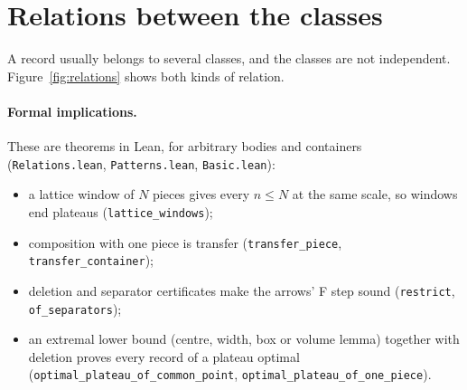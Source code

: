 \documentclass[11pt,a4paper]{article}
\newcommand{\code}[1]{\texttt{\nolinkurl{#1}}}
\newcommand{\lean}[1]{\texttt{#1}}
\theoremstyle{definition}
\theoremstyle{remark}
\begin{document}
\section{Relations between the classes}\label{sec:relations}

A record usually belongs to several classes, and the classes are not independent. Figure~\ref{fig:relations} shows both kinds of relation.

\paragraph{Formal implications.} These are theorems in Lean, for arbitrary bodies and containers (\code{Relations.lean}, \code{Patterns.lean}, \code{Basic.lean}):
\begin{itemize}
\item a lattice window of $N$ pieces gives every $n\le N$ at the same scale, so windows end plateaus (\lean{lattice\_windows});
\item composition with one piece is transfer (\lean{transfer\_piece}, \lean{transfer\_container});
\item deletion and separator certificates make the arrows' F step sound (\lean{restrict}, \lean{of\_separators});
\item an extremal lower bound (centre, width, box or volume lemma) together with deletion proves every record of a plateau optimal (\lean{optimal\_plateau\_of\_common\_point}, \lean{optimal\_plateau\_of\_one\_piece}).
\end{itemize}
\end{document}
